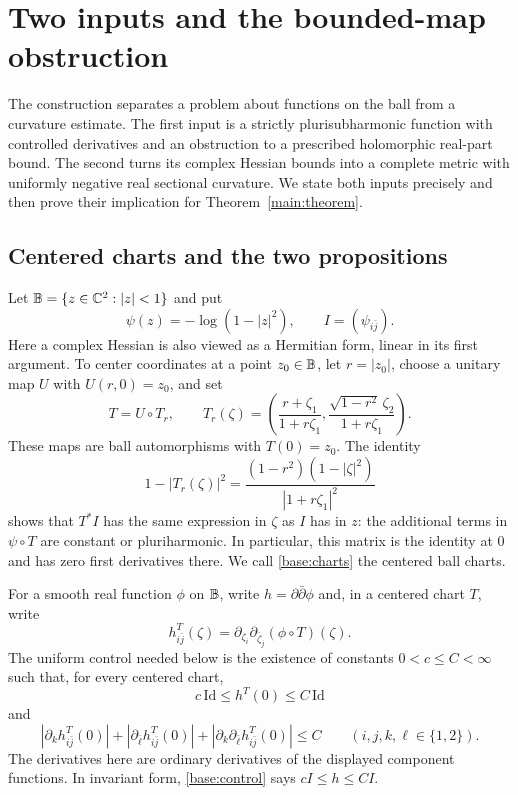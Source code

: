 \section{Two inputs and the bounded-map obstruction}\label{sec:reduction}

The construction separates a problem about functions on the ball from a
curvature estimate.  The first input is a strictly plurisubharmonic
function with controlled derivatives and an obstruction to a prescribed
holomorphic real-part bound.  The second turns its complex Hessian bounds
into a complete metric with uniformly negative real sectional curvature.
We state both inputs precisely and then prove their implication for
Theorem~\ref{main:theorem}.

\subsection{Centered charts and the two propositions}

Let $\mathbb B=\{z\in\mathbb C^2:|z|<1\}$ and put
\[
 \psi(z)=-\log(1-|z|^2),\qquad
 I=(\psi_{i\bar j}).
\]
Here a complex Hessian is also viewed as a Hermitian form, linear in its
first argument.  To center coordinates at a point $z_0\in\mathbb B$, let
$r=|z_0|$, choose a unitary map $U$ with $U(r,0)=z_0$, and set
\begin{equation}\label{base:charts}
 T=U\circ T_r,\qquad
 T_r(\zeta)=\left(
 \frac{r+\zeta_1}{1+r\zeta_1},
 \frac{\sqrt{1-r^2}\,\zeta_2}{1+r\zeta_1}
 \right).
\end{equation}
These maps are ball automorphisms with $T(0)=z_0$.  The identity
\[
 1-|T_r(\zeta)|^2
 =\frac{(1-r^2)(1-|\zeta|^2)}{|1+r\zeta_1|^2}
\]
shows that $T^*I$ has the same expression in $\zeta$ as $I$ has in $z$:
the additional terms in $\psi\circ T$ are constant or pluriharmonic.
In particular, this matrix is the identity at $0$ and has zero first
derivatives there.  We call \eqref{base:charts} the centered ball charts.

For a smooth real function $\phi$ on $\mathbb B$, write
$h=\partial\bar\partial\phi$ and, in a centered chart $T$, write
\[
 h^T_{i\bar j}(\zeta)
 =\partial_{\zeta_i}\partial_{\bar\zeta_j}(\phi\circ T)(\zeta).
\]
The uniform control needed below is the existence of constants
$0<c\le C<\infty$ such that, for every centered chart,
\begin{equation}\label{base:control}
 c\,\mathrm{Id}\le h^T(0)\le C\,\mathrm{Id}
\end{equation}
and
\begin{equation}\label{base:jets}
 \left|\partial_k h^T_{i\bar j}(0)\right|
 +\left|\partial_{\bar\ell}h^T_{i\bar j}(0)\right|
 +\left|\partial_k\partial_{\bar\ell}h^T_{i\bar j}(0)\right|
 \le C
 \qquad(i,j,k,\ell\in\{1,2\}).
\end{equation}
The derivatives here are ordinary derivatives of the displayed component
functions.  In invariant form, \eqref{base:control} says $cI\le h\le CI$.

